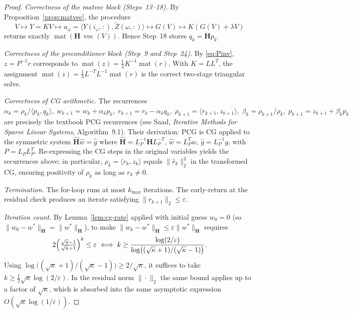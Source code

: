 \documentclass[12pt]{article}
\theoremstyle{definition}
\newcommand{\vecop}{\operatorname{vec}}
\newcommand{\matop}{\operatorname{mat}}
\newcommand{\Zt}{\widetilde{Z}}
\begin{document}
\begin{proof}
\emph{Correctness of the matvec block (Steps~13--18).}
By Proposition~\ref{prop:matvec}, the procedure
\[
V\mapsto Y=KV \mapsto u_\omega=\langle Y(i_\omega,:),\Zt(\omega,:)\rangle
\mapsto G(V)\mapsto K(G(V)+\lambda V)
\]
returns exactly $\matop(\mathbf{H}\,\vecop(V))$. Hence Step~18 stores $q_k=\mathbf{H}p_k$.

\emph{Correctness of the preconditioner block (Step~9 and Step~24).}
By \eqref{eq:Pinv}, $z=P^{-1}r$ corresponds to $\matop(z)=\tfrac{1}{\lambda}K^{-1}\matop(r)$.
With $K=LL^T$, the assignment $\matop(z)=\tfrac{1}{\lambda}L^{-T}L^{-1}\matop(r)$ is the
correct two-stage triangular solve.

\emph{Correctness of CG arithmetic.}
The recurrences
\(
\alpha_k=\rho_k/\langle p_k,q_k\rangle,\;
w_{k+1}=w_k+\alpha_k p_k,\;
r_{k+1}=r_k-\alpha_k q_k,\;
\rho_{k+1}=\langle r_{k+1},z_{k+1}\rangle,\;
\beta_k=\rho_{k+1}/\rho_k,\;
p_{k+1}=z_{k+1}+\beta_k p_k
\)
are precisely the textbook PCG recurrences (see Saad, \emph{Iterative Methods for Sparse Linear
Systems}, Algorithm~9.1). Their derivation: PCG is CG applied to the symmetric system
$\widehat{\mathbf{H}}\widehat{w}=\widehat{g}$ where $\widehat{\mathbf{H}}=L_P^{-1}\mathbf{H}L_P^{-T}$,
$\widehat{w}=L_P^Tw$, $\widehat{g}=L_P^{-1}g$, with $P=L_PL_P^T$. Re-expressing the CG steps in
the original variables yields the recurrences above; in particular,
$\rho_k=\langle r_k,z_k\rangle$ equals $\|\widehat{r}_k\|_2^2$ in the transformed CG, ensuring
positivity of $\rho_k$ as long as $r_k\neq 0$.

\emph{Termination.} The for-loop runs at most $k_{\max}$ iterations. The early-return at the
residual check produces an iterate satisfying $\|r_{k+1}\|_2\leq\varepsilon$.

\emph{Iteration count.} By Lemma~\ref{lem:cg-rate} applied with initial guess $w_0=0$ (so
$\|w_0-w^*\|_{\mathbf{H}}=\|w^*\|_{\mathbf{H}}$), to make
$\|w_k-w^*\|_{\mathbf{H}}\leq\varepsilon\|w^*\|_{\mathbf{H}}$ requires
\[
2\Bigl(\tfrac{\sqrt\kappa-1}{\sqrt\kappa+1}\Bigr)^k\leq\varepsilon
\;\Longleftrightarrow\;
k\geq \frac{\log(2/\varepsilon)}{\log\bigl((\sqrt\kappa+1)/(\sqrt\kappa-1)\bigr)}.
\]
Using $\log\bigl((\sqrt\kappa+1)/(\sqrt\kappa-1)\bigr)\geq 2/\sqrt\kappa$, it suffices to take
$k\geq \tfrac{1}{2}\sqrt\kappa\log(2/\varepsilon)$. In the residual norm $\|\cdot\|_2$ the same
bound applies up to a factor of $\sqrt{\kappa}$, which is absorbed into the same asymptotic
expression $O(\sqrt{\kappa}\log(1/\varepsilon))$.
\end{proof}
\end{document}
